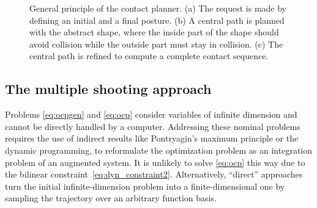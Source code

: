 \begin{figure}[h!t!]
  \begin{center}
    \quad
    \quad
    \caption{General principle of the contact planner. (a) The request is made by defining an initial and a final posture. (b) A central path is planned with the abstract shape, where the inside part of the shape should avoid collision while the outside part must stay in collision. (c) The central path is refined to compute a complete contact sequence.}
     \label{fig:rbprm}
   \end{center}
\end{figure}

\subsection{The multiple shooting approach}

Problems \eqref{eq:ocpgen} and \eqref{eq:ocp} consider variables of infinite dimension and cannot be directly handled by a computer. Addressing these nominal problems requires the use of indirect results like Pontryagin's maximum principle or the dynamic programming, to reformulate the optimization problem as an integration problem of an augmented system. It is unlikely to solve \eqref{eq:ocp} this way due to the bilinear constraint~\eqref{eq:dyn_constraint2}. Alternatively, ``direct'' approaches turn the initial infinite-dimension problem into a finite-dimensional one by sampling the trajectory over an arbitrary function basis. 

